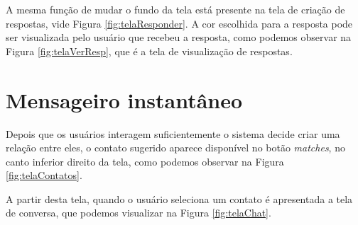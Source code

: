 A mesma função de mudar o fundo da tela está presente na tela de criação de respostas, vide Figura \ref{fig:telaResponder}. A cor escolhida para a resposta pode ser visualizada pelo usuário que recebeu a resposta, como podemos observar na Figura \ref{fig:telaVerResp}, que é a tela de visualização de respostas.



\section{Mensageiro instantâneo}

Depois que os usuários interagem suficientemente o sistema decide criar uma relação entre eles, o contato sugerido aparece disponível no botão \emph{matches}, no canto inferior direito da tela, como podemos observar na Figura \ref{fig:telaContatos}.

A partir desta tela, quando o usuário seleciona um contato é apresentada a tela de conversa, que podemos visualizar na Figura \ref{fig:telaChat}.


